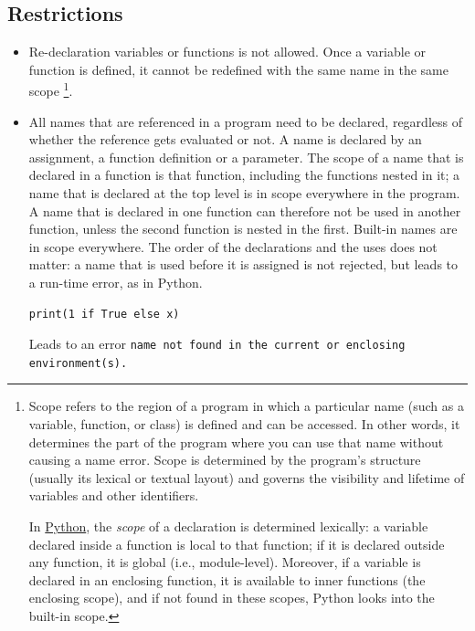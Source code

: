 \subsection*{Restrictions}

\begin{itemize}

  
\item Re-declaration variables or functions is not allowed. Once a variable or function is defined, it cannot be redefined with the same name in the same scope
\footnote{
Scope refers to the region of a program in which a particular name (such as a variable, function, or class) is defined and can be accessed. In other words, 
it determines the part of the program where you can use that name without causing a name error. 
Scope is determined by the program's structure (usually its lexical or textual layout) and governs the visibility and lifetime of variables and other identifiers.

In \href{https://docs.python.org/3/tutorial/classes.html\#python-scopes-and-namespaces}{\color{DarkBlue}Python}, the \emph{scope} of a declaration is determined lexically: a variable declared inside a function is local to that function; 
if it is declared outside any function, it is global (i.e., module-level). Moreover, if a variable is declared in an enclosing function, 
it is available to inner functions (the enclosing scope), and if not found in these scopes, Python looks into the built-in scope.
}.

\item All names that are referenced in a program need to be declared, regardless of whether the
reference gets evaluated or not. A name is declared by an assignment, a function definition or a
parameter. The scope of a name that is declared in a function is that function, including the
functions nested in it; a name that is declared at the top level is in scope everywhere in the
program. A name that is declared in one function can therefore not be used in another function,
unless the second function is nested in the first. Built-in names are in scope everywhere. The
order of the declarations and the uses does not matter: a name that is used before it is
assigned is not rejected, but leads to a run-time error, as in Python.
\begin{lstlisting}
print(1 if True else x)
\end{lstlisting}
Leads to an error \texttt{name not found in the current or enclosing environment(s).}
\end{itemize}
